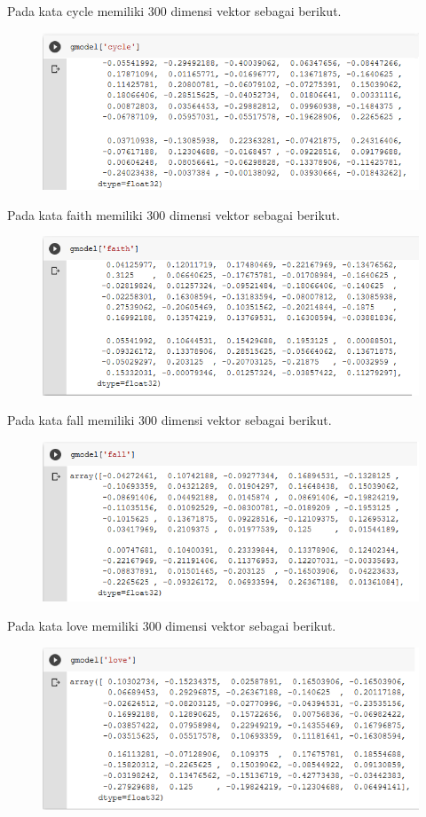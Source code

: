 \begin{enumerate}
	\hfill\break
	Pada kata cycle memiliki 300 dimensi vektor sebagai berikut.
	\hfill\break
	\begin{figure}[H]
	\centering
		\includegraphics[width=8 cm]{figures/1174006/chapter5/soalpraktek/cycle.PNG}
	\end{figure}

	\hfill\break
	Pada kata faith memiliki 300 dimensi vektor sebagai berikut.
	\hfill\break
	\begin{figure}[H]
	\centering
		\includegraphics[width=8 cm]{figures/1174006/chapter5/soalpraktek/faith.PNG}
	\end{figure}

	\hfill\break
	Pada kata fall memiliki 300 dimensi vektor sebagai berikut.
	\hfill\break
	\begin{figure}[H]
	\centering
		\includegraphics[width=8 cm]{figures/1174006/chapter5/soalpraktek/fall.PNG}
	\end{figure}

	\hfill\break
	Pada kata love memiliki 300 dimensi vektor sebagai berikut.
	\hfill\break
	\begin{figure}[H]
	\centering
		\includegraphics[width=8 cm]{figures/1174006/chapter5/soalpraktek/love.PNG}
	\end{figure}


\end{enumerate}

